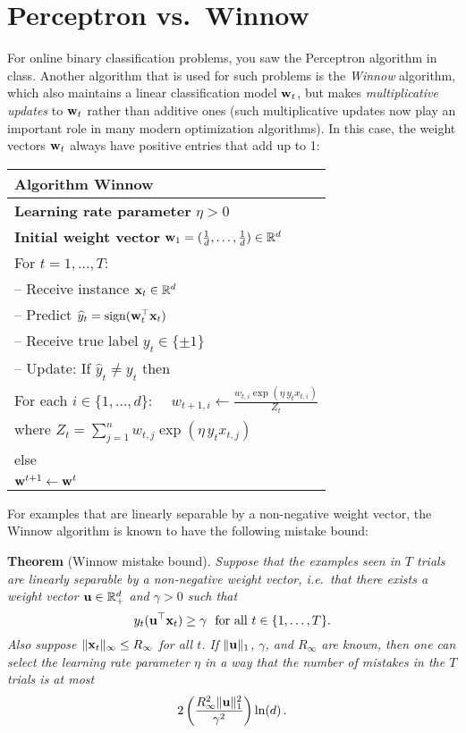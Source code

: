 \section{Perceptron vs.\ Winnow }
For online binary classification problems, you saw the Perceptron algorithm in class. Another algorithm that is used for such problems is the \emph{Winnow} algorithm, which also maintains a linear classification model ${\mathbf w}_t$, but makes \emph{multiplicative updates} to ${\mathbf w}_t$ rather than additive ones (such multiplicative updates now play an important role in many modern optimization algorithms). In this case, the weight vectors ${\mathbf w}_t$ always have positive entries that add up to 1:
%
\begin{center}
\begin{tabular}{l}
\hline
Algorithm \textbf{Winnow} \rule{0pt}{12pt} \\
\hline
\textbf{Learning rate parameter} $\eta > 0$ \rule{0pt}{12pt} \\
\textbf{Initial weight vector} ${\mathbf w}_1 = (\frac{1}{d},\ldots,\frac{1}{d})\in{\mathbb R}^d$ \\
For $t=1,\ldots,T$:\\
\quad-- Receive instance ${\mathbf x}_t \in {\mathbb R}^d$\\
\quad-- Predict $\widehat{y}_t = \textup{\textrm{sign}}({\mathbf w}_t^\top{\mathbf x}_t)$\\
\quad-- Receive true label $y_t \in \{\pm1\}$\\
\quad-- Update: If $\hat{y}_t \neq y_t$ then \\
\quad\quad\quad For each $i\in\{1,\ldots,d\}$:~~ $w_{t+1,i} \leftarrow \displaystyle{\frac{w_{t,i} \exp(\eta \, y_t x_{t,i})}{Z_t}}$ \\[6pt]
\quad\quad\quad \hspace{1.5cm} where $Z_t = \sum_{j=1}^n w_{t,j} \exp(\eta \, y_t x_{t,j})$ \\
\quad\quad else \\
\quad\quad\quad ${\mathbf w}^{t+1} \leftarrow {\mathbf w}^t$\\[2pt]
\hline
\end{tabular}
\end{center}
%
For 
examples that are linearly separable by a non-negative weight vector, the Winnow algorithm is known to have the following mistake bound:

\textbf{Theorem} (Winnow mistake bound).
\emph{
Suppose that the examples seen in $T$ trials are linearly separable by a non-negative weight vector, i.e.\ that there exists a weight vector ${\mathbf u}\in{\mathbb R}_+^d$ and $\gamma>0$ such that 
\[
y_t ({\mathbf u}^\top {\mathbf x}_t) \geq \gamma ~~\text{for all $t\in\{1,\ldots,T\}$.} 
\]
Also suppose $\|{\mathbf x}_t\|_\infty \leq R_\infty$ for all $t$.
If $\|{\mathbf u}\|_1$, $\gamma$, and $R_\infty$ are known, then one can select the learning rate parameter $\eta$ in a way that the number of mistakes in the $T$ trials is at most
\[
    2 \left( \frac{R_\infty^2 \|{\mathbf u}\|_1^2}{\gamma^2} \right) \ln (d)
    \,.
\]
}


